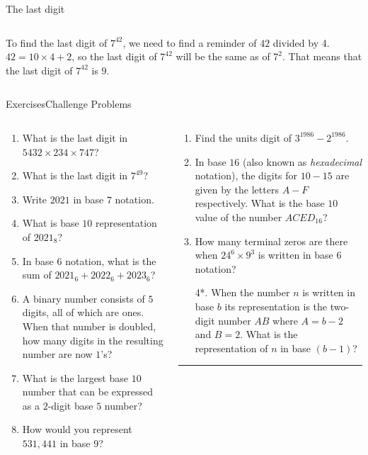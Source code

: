 \documentclass[9pt,aspectratio=169]{beamer}
\begin{document}
\begin{frame}{The last digit}
\begin{columns}[T]
\begin{column}{0.5\textwidth}
      To find the last digit of $7^{42}$, we need to find a reminder of $42$ divided by 4. $42 = 10 \times 4 + 2$, so the last digit of $7^{42}$ will be the same as of $7^2$. That means that the last digit of $7^{42}$ is $9$.
    \end{column}
  \end{columns}
\end{frame}

\begin{frame}{Exercises\hspace*{0.35\textwidth}Challenge Problems}
  \begin{columns}[T]
    \begin{column}{0.5\textwidth}
      \begin{enumerate}
        \item What is the last digit in $5432 \times 234 \times 747$?
        \item What is the last digit in $7^{49}$?
        \item Write $2021$ in base $7$ notation.
        \item What is base $10$ representation of $2021_8$?
        \item In base $6$ notation, what is the sum of $2021_6 + 2022_6 +  2023_6$?
        \item A binary number consists of $5$ digits, all of which are ones.  When that number is doubled, how many digits in the resulting number are now $1$’s?
        \item What is the largest base $10$ number that can be expressed as a $2$-digit base $5$ number?
        \item How would you represent $531{,}441$ in base $9$?
      \end{enumerate}
    \end{column}
    \begin{column}{0.5\textwidth}
      \begin{enumerate}
        \item Find the units digit of $3^{1986} - 2^{1986}$.
        \item In base $16$ (also known as \emph{hexadecimal} notation), the digits for $10-15$ are given by the letters $A-F$ respectively.  What is the base $10$ value of the number $ACED_{16}$?
        \item How many terminal zeros are there when $24^6 \times 9^3$ is written in base $6$ notation?
        \item[4*.] When the number $n$ is written in base $b$ its representation is the two-digit number $AB$ where $A = b-2$ and $B = 2$.  What is the representation of $n$ in base $(b-1)$?
      \end{enumerate}
      \vspace*{5\baselineskip}
      \hspace{2em}\rule{0.3\textwidth}{0.2pt}

      \hspace{2.5em}{\footnotesize * very hard}
    \end{column}
  \end{columns}
\end{frame}
\end{document}
